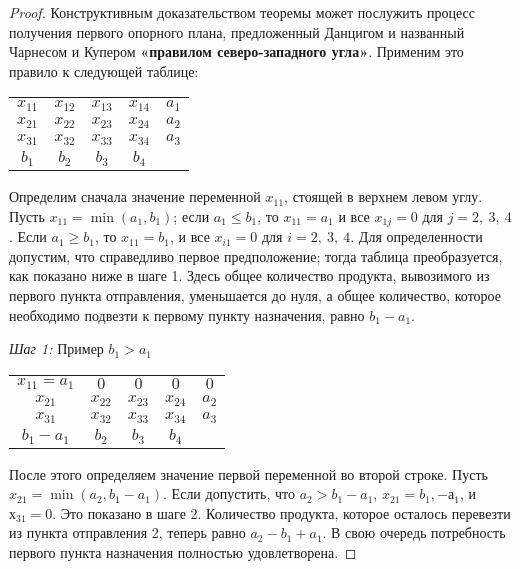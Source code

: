 \documentclass[a4paper,12pt]{article}
\begin{document}
	\begin{proof}
		Конструктивным доказательством теоремы может послужить процесс получения первого опорного плана, предложенный Данцигом и названный Чарнесом и Купером \textbf{«правилом северо-западного угла»}. Применим это правило к следующей таблице:
		
		\begin{center}
			\begin{tabular}{cccc|c}
				$x_{11}$ & $x_{12}$ & $x_{13}$ & $x_{14}$ & $a_1$ \\
				$x_{21}$ & $x_{22}$ & $x_{23}$ & $x_{24}$ & $a_2$ \\
				$x_{31}$ & $x_{32}$ & $x_{33}$ & $x_{34}$ & $a_3$ \\ \hline
				$b_1$ & $b_2$ & $b_3$ & $b_4$ & 
			\end{tabular}
		\end{center}
	
		Определим сначала значение переменной $x_{11}$, стоящей в верхнем левом углу. Пусть $x_{11} = \min(a_1,b_1)$; если $a_1 \leqslant b_1$, то $x_{11} = a_1$ и все $x_{1j} = 0$ для $j = 2,\ 3,\ 4$. Если $a_1 \geqslant b_1$, то $x_{11} = b_1$, и все $x_{i1} = 0$ для $i = 2,\ 3,\ 4$. Для определенности допустим, что справедливо первое предположение; тогда таблица преобразуется, как показано ниже в шаге 1. Здесь общее количество продукта, вывозимого из первого пункта отправления, уменьшается до нуля, а общее количество, которое необходимо подвезти к первому пункту назначения, равно $b_1 - a_1$.
		
		\textit{Шаг 1:} Пример $b_1 > a_1$
		\begin{center}
			\begin{tabular}{cccc|c}
				$x_{11} = a_1$ & $0$ & $0$ & $0$ & $0$ \\
				$x_{21}$ & $x_{22}$ & $x_{23}$ & $x_{24}$ & $a_2$ \\
				$x_{31}$ & $x_{32}$ & $x_{33}$ & $x_{34}$ & $a_3$ \\ \hline
				$b_1 - a_1$ & $b_2$ & $b_3$ & $b_4$ & 
			\end{tabular}
		\end{center}
		
		После этого определяем значение первой переменной во второй строке.  Пусть $x_{21} = \min(a_2, b_1 - a_1)$. Если допустить, что $a_2 > b_1 - a_1$, $x_{21} = b_1, - а_1$, и $х_{31} = 0$. Это показано в шаге 2. Количество продукта, которое осталось перевезти из пункта отправления 2, теперь равно $a_2 - b_1 + a_1$. В свою очередь потребность первого пункта назначения полностью удовлетворена.
		

\end{proof}
\end{document}
